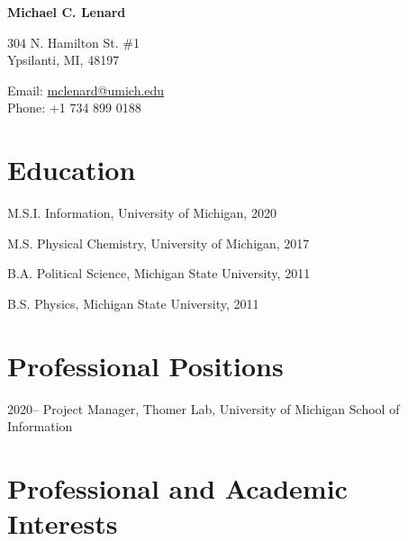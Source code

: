 \documentclass[12pt,letterpaper]{report}
\newcommand{\myname}{Michael C. Lenard}
\newcommand{\namefont}[1]{{\normalfont\bfseries\Huge{#1}}}
\begin{document}
 \raggedright

\namefont{\myname}

\vspace{1em}
\begin{minipage}[t]{0.68\textwidth}
        304 N. Hamilton St. \#1 \\
Ypsilanti, MI, 48197
\end{minipage}
\begin{minipage}[t]{0.31\textwidth}
        Email: \href{mailto:mclenard@umich.edu}{mclenard@umich.edu} \\
        Phone: +1 734 899 0188
\end{minipage}
\vspace{0.5em}



\section*{Education}

\begin{tablist}

	\item[M.S.I.] \tab Information, University of Michigan, 2020

	\item[M.S.]  \tab Physical Chemistry, University of Michigan, 2017

	\item[B.A.]  \tab Political Science, Michigan State University, 2011
        
	\item[B.S.]  \tab Physics, Michigan State University, 2011

\end{tablist}



\section*{Professional Positions}

\begin{tablist}

\item[2020--] \tab Project Manager, Thomer Lab, University of Michigan School of Information

\end{tablist}



\section*{Professional and Academic Interests}
\end{document}
